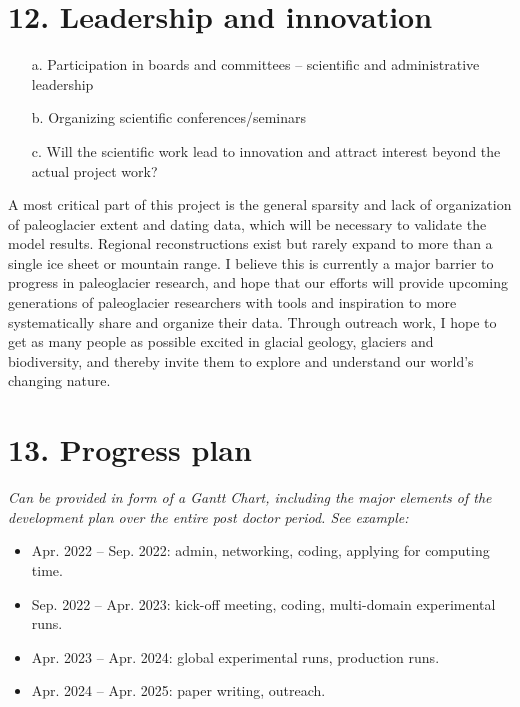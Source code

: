 \documentclass{article}
\newcommand{\guideline}[1]{{\color{color2}\itshape{#1}}}
\begin{document}
\section{12. Leadership and innovation}

    \guideline{
        \begin{itemize}
          \item[a.] Participation in boards and committees – scientific and
            administrative leadership
          \item[b.] Organizing scientific conferences/seminars
          \item[c.] Will the scientific work lead to innovation and attract
            interest beyond the actual project work?
        \end{itemize}}

    A most critical part of this project is the general sparsity and lack of
    organization of paleoglacier extent and dating data, which will be
    necessary to validate the model results. Regional reconstructions exist but
    rarely expand to more than a single ice sheet or mountain range. I believe
    this is currently a major barrier to progress in paleoglacier research, and
    hope that our efforts will provide upcoming generations of paleoglacier
    researchers with tools and inspiration to more systematically share and
    organize their data. Through outreach work, I hope to get as many people
    as possible excited in glacial geology, glaciers and biodiversity, and
    thereby invite them to explore and understand our world's changing nature.


\section{13. Progress plan}

    \guideline{
        Can be provided in form of a Gantt Chart, including the major elements
        of the development plan over the entire post doctor period. See
        example:}

    \begin{itemize}
      \item Apr. 2022 -- Sep. 2022: admin, networking, coding, applying for
        computing time.
      \item Sep. 2022 -- Apr. 2023: kick-off meeting, coding, multi-domain
        experimental runs.
      \item Apr. 2023 -- Apr. 2024: global experimental runs, production runs.
      \item Apr. 2024 -- Apr. 2025: paper writing, outreach.
    \end{itemize}
\end{document}
